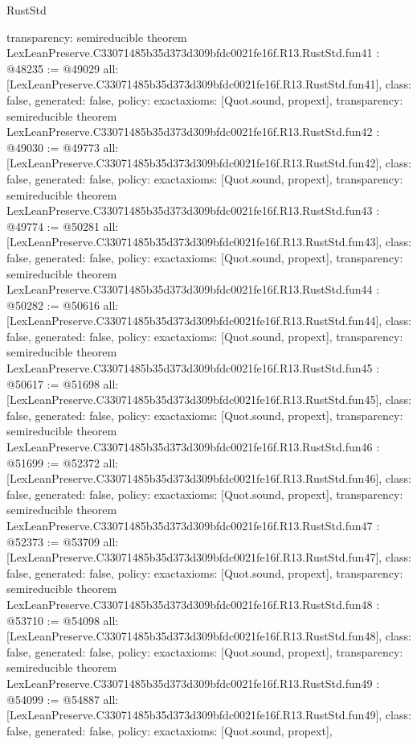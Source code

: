 \begin{lexlean}{RustStd}
\begin{coremodule}
{  transparency: semireducible
}
theorem LexLeanPreserve.C33071485b35d373d309bfdc0021fe16f.R13.RustStd.fun41 : @48235 := @49029 {
  all: [LexLeanPreserve.C33071485b35d373d309bfdc0021fe16f.R13.RustStd.fun41],
  class: false,
  generated: false,
  policy: exact{axioms: [Quot.sound, propext]},
  transparency: semireducible
}
theorem LexLeanPreserve.C33071485b35d373d309bfdc0021fe16f.R13.RustStd.fun42 : @49030 := @49773 {
  all: [LexLeanPreserve.C33071485b35d373d309bfdc0021fe16f.R13.RustStd.fun42],
  class: false,
  generated: false,
  policy: exact{axioms: [Quot.sound, propext]},
  transparency: semireducible
}
theorem LexLeanPreserve.C33071485b35d373d309bfdc0021fe16f.R13.RustStd.fun43 : @49774 := @50281 {
  all: [LexLeanPreserve.C33071485b35d373d309bfdc0021fe16f.R13.RustStd.fun43],
  class: false,
  generated: false,
  policy: exact{axioms: [Quot.sound, propext]},
  transparency: semireducible
}
theorem LexLeanPreserve.C33071485b35d373d309bfdc0021fe16f.R13.RustStd.fun44 : @50282 := @50616 {
  all: [LexLeanPreserve.C33071485b35d373d309bfdc0021fe16f.R13.RustStd.fun44],
  class: false,
  generated: false,
  policy: exact{axioms: [Quot.sound, propext]},
  transparency: semireducible
}
theorem LexLeanPreserve.C33071485b35d373d309bfdc0021fe16f.R13.RustStd.fun45 : @50617 := @51698 {
  all: [LexLeanPreserve.C33071485b35d373d309bfdc0021fe16f.R13.RustStd.fun45],
  class: false,
  generated: false,
  policy: exact{axioms: [Quot.sound, propext]},
  transparency: semireducible
}
theorem LexLeanPreserve.C33071485b35d373d309bfdc0021fe16f.R13.RustStd.fun46 : @51699 := @52372 {
  all: [LexLeanPreserve.C33071485b35d373d309bfdc0021fe16f.R13.RustStd.fun46],
  class: false,
  generated: false,
  policy: exact{axioms: [Quot.sound, propext]},
  transparency: semireducible
}
theorem LexLeanPreserve.C33071485b35d373d309bfdc0021fe16f.R13.RustStd.fun47 : @52373 := @53709 {
  all: [LexLeanPreserve.C33071485b35d373d309bfdc0021fe16f.R13.RustStd.fun47],
  class: false,
  generated: false,
  policy: exact{axioms: [Quot.sound, propext]},
  transparency: semireducible
}
theorem LexLeanPreserve.C33071485b35d373d309bfdc0021fe16f.R13.RustStd.fun48 : @53710 := @54098 {
  all: [LexLeanPreserve.C33071485b35d373d309bfdc0021fe16f.R13.RustStd.fun48],
  class: false,
  generated: false,
  policy: exact{axioms: [Quot.sound, propext]},
  transparency: semireducible
}
theorem LexLeanPreserve.C33071485b35d373d309bfdc0021fe16f.R13.RustStd.fun49 : @54099 := @54887 {
  all: [LexLeanPreserve.C33071485b35d373d309bfdc0021fe16f.R13.RustStd.fun49],
  class: false,
  generated: false,
  policy: exact{axioms: [Quot.sound, propext]},
}
\end{coremodule}
\end{lexlean}
